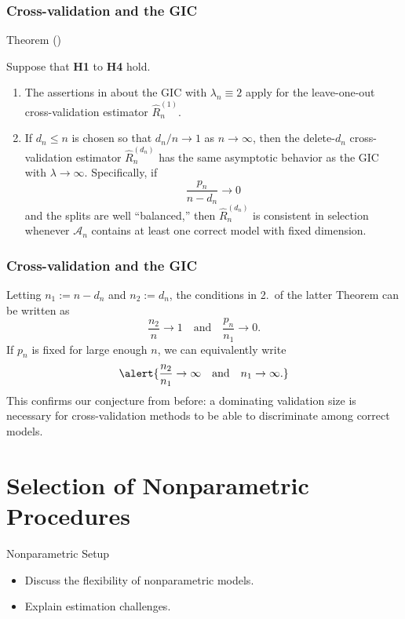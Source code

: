 \documentclass{beamer}
\newcommand{\0}{\emptyset}
\newcommand{\Acal}{\mathcal{A}_{n}}
\newcommand{\1}{\mathmybb{1}}
\begin{document}
\begin{frame}
  \frametitle{Cross-validation and the GIC}
  \begin{block}{Theorem (\cite{shao_1997})}
    
    Suppose that \textbf{H1} to \textbf{H4} hold.
    
    \begin{enumerate}
      \item The assertions in about the GIC with \(\lambda_{n}\equiv 2\) apply for the leave-one-out cross-validation estimator \(\hat{R}_{n}^{(1)}\).
      \item If \(d_{n}\leq n\) is chosen so that \(d_{n}/n\to1\) as \(n\to\infty\), then the delete-\(d_{n}\) cross-validation estimator \(\hat{R}_{n}^{(d_{n})}\) has the same asymptotic behavior as the GIC with \(\lambda\to\infty\). Specifically, if \[\frac{p_{n}}{n-d_{n}}\to 0\] and the splits are well ``balanced,'' then \(\hat{R}_{n}^{(d_{n})}\) is consistent in selection whenever \(\Acal\) contains at least one correct model with fixed dimension.
    \end{enumerate}
  \end{block}
    
\end{frame}

\begin{frame}
  \frametitle{Cross-validation and the GIC}
  Letting \(n_{1}:=n-d_{n}\)  and \(n_{2}:=d_{n}\), the conditions in 2.\ of the latter Theorem can be written as 
\[\frac{n_{2}}{n}\to 1\quad\text{and}\quad \frac{p_{n}}{n_{1}}\to 0.\]
If \(p_{n}\) is fixed for large enough \(n\), we can equivalently write
\begin{equation}\label{eq:lmsplitcond}
    \alert{\frac{n_{2}}{n_{1}}\to\infty\quad\text{and}\quad n_{1}\to \infty.}
\end{equation}
This confirms our conjecture from before: a dominating validation size is necessary for cross-validation methods to be able to discriminate among correct models.

\end{frame}


\section{Selection of Nonparametric Procedures}
\begin{frame}{Nonparametric Setup}
  \begin{itemize}
    \item Discuss the flexibility of nonparametric models.
    \item Explain estimation challenges.
  \end{itemize}
\end{frame}
\end{document}
